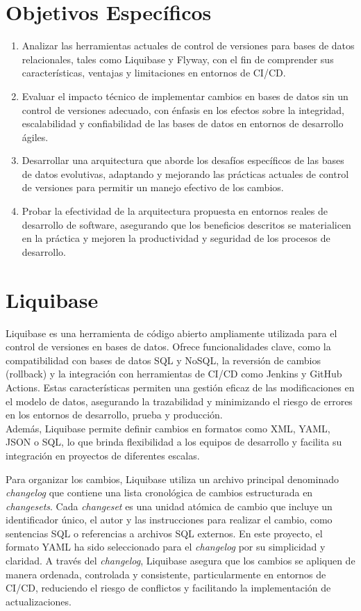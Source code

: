 \documentclass{IEEEtran}
\begin{document}
\section{Objetivos Específicos}
\begin{enumerate}
    \item Analizar las herramientas actuales de control de versiones para bases de datos relacionales, tales como Liquibase y Flyway, con el fin de comprender sus características, ventajas y limitaciones en entornos de CI/CD.
    \item Evaluar el impacto técnico de implementar cambios en bases de datos sin un control de versiones adecuado, con énfasis en los efectos sobre la integridad, escalabilidad y confiabilidad de las bases de datos en entornos de desarrollo ágiles.
    \item Desarrollar una arquitectura que aborde los desafíos específicos de las bases de datos evolutivas, adaptando y mejorando las prácticas actuales de control de versiones para permitir un manejo efectivo de los cambios.
    \item Probar la efectividad de la arquitectura propuesta en entornos reales de desarrollo de software, asegurando que los beneficios descritos se materialicen en la práctica y mejoren la productividad y seguridad de los procesos de desarrollo.
\end{enumerate}

\section{Liquibase}

Liquibase es una herramienta de código abierto ampliamente utilizada para el control de versiones en bases de datos. Ofrece funcionalidades clave, como la compatibilidad con bases de datos SQL y NoSQL, la reversión de cambios (rollback) y la integración con herramientas de CI/CD como Jenkins y GitHub Actions. Estas características permiten una gestión eficaz de las modificaciones en el modelo de datos, asegurando la trazabilidad y minimizando el riesgo de errores en los entornos de desarrollo, prueba y producción.\\ Además, Liquibase permite definir cambios en formatos como XML, YAML, JSON o SQL, lo que brinda flexibilidad a los equipos de desarrollo y facilita su integración en proyectos de diferentes escalas.

Para organizar los cambios, Liquibase utiliza un archivo principal denominado \textit{changelog} que contiene una lista cronológica de cambios estructurada en \textit{changesets}. Cada \textit{changeset} es una unidad atómica de cambio que incluye un identificador único, el autor y las instrucciones para realizar el cambio, como sentencias SQL o referencias a archivos SQL externos. En este proyecto, el formato YAML ha sido seleccionado para el \textit{changelog} por su simplicidad y claridad. A través del \textit{changelog}, Liquibase asegura que los cambios se apliquen de manera ordenada, controlada y consistente, particularmente en entornos de CI/CD, reduciendo el riesgo de conflictos y facilitando la implementación de actualizaciones.
\end{document}
